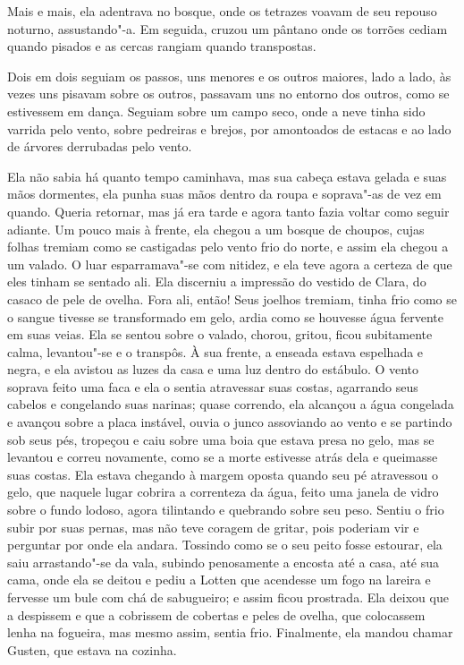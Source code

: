 Mais e mais, ela adentrava no bosque, onde os tetrazes voavam de seu repouso noturno,
assustando"-a. Em seguida, cruzou um pântano onde os torrões cediam
quando pisados e as cercas rangiam quando transpostas.

Dois em dois seguiam os passos, uns menores e os outros maiores, lado a lado, às
vezes uns pisavam sobre os outros, passavam uns no entorno dos outros, como se
estivessem em dança. Seguiam sobre um campo seco, onde a neve tinha sido varrida
pelo vento, sobre pedreiras e brejos, por amontoados de estacas e ao lado de
árvores derrubadas pelo vento.

Ela não sabia há quanto tempo caminhava, mas sua cabeça estava gelada e suas
mãos dormentes, ela punha suas mãos dentro da roupa e soprava"-as de vez em
quando. Queria retornar, mas já era tarde e agora tanto fazia voltar como
seguir adiante. Um pouco mais à frente, ela chegou a um bosque de choupos, cujas
folhas tremiam como se castigadas pelo vento frio do norte, e assim ela
chegou a um valado. O luar esparramava"-se com nitidez, e ela teve agora a
certeza de que eles tinham se sentado ali. Ela discerniu a impressão do vestido de
Clara, do casaco de pele de ovelha. Fora ali, então! Seus joelhos tremiam, tinha
frio como se o sangue tivesse se transformado em gelo, ardia como se houvesse
água fervente em suas veias. Ela se sentou sobre o valado, chorou, gritou, ficou
subitamente calma, levantou"-se e o transpôs. À sua frente, a enseada estava
espelhada e negra, e ela avistou as luzes da casa e uma
luz dentro do estábulo. O vento soprava feito uma faca e ela o sentia atravessar
suas costas, agarrando seus cabelos e congelando suas narinas; quase correndo,
ela alcançou a água congelada e avançou sobre a placa instável, ouvia o
junco assoviando ao vento e se partindo sob seus pés, tropeçou e caiu sobre
uma boia que estava presa no gelo, mas se levantou e correu novamente, como se a
morte estivesse atrás dela e queimasse suas costas. Ela estava chegando à margem
oposta quando seu pé atravessou o gelo, que naquele lugar cobrira a correnteza
da água, feito uma janela de vidro sobre o fundo lodoso, agora tilintando e
quebrando sobre seu peso. Sentiu o frio subir por suas pernas, mas não teve
coragem de gritar, pois poderiam vir e perguntar por onde ela andara. Tossindo
como se o seu peito fosse estourar, ela saiu arrastando"-se da vala, subindo
penosamente a encosta até a casa, até sua cama, onde ela se deitou e pediu a Lotten
que acendesse um fogo na lareira e fervesse um bule com chá de sabugueiro; e
assim ficou prostrada. Ela deixou que a despissem e que a cobrissem de
cobertas e peles de ovelha, que colocassem lenha na fogueira, mas mesmo assim,
sentia frio. Finalmente, ela mandou chamar Gusten, que estava na cozinha.

